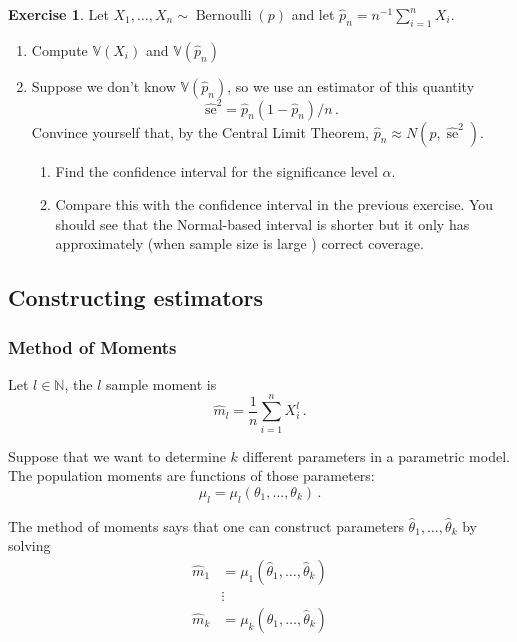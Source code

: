 \documentclass[
  openany]{book}
\theoremstyle{definition}
\theoremstyle{definition}
\theoremstyle{definition}
\newtheorem{exercise}{Exercise}[chapter]
\theoremstyle{definition}
\theoremstyle{remark}
\begin{document}
\begin{exercise}

Let \(X_1, \ldots, X_n \sim \operatorname{Bernoulli}(p)\) and let \(\widehat{p}_n=n^{-1} \sum_{i=1}^n X_i\).

\begin{enumerate}
\def\labelenumi{\arabic{enumi}.}
\item
  Compute \(\mathbb{V}( X_i)\) and \(\mathbb{V}(\hat p_n)\)
\item
  Suppose we don't know \(\mathbb{V}(\hat p_n)\), so we use an estimator of this quantity
  \[\widehat{\mathrm{se}}^2 = {\widehat{p}_n\left(1-\widehat{p}_n\right) / n} \,.\]
  Convince yourself that, by the Central Limit Theorem, \(\widehat{p}_n \approx N\left(p, \widehat{\operatorname{se}}^2\right)\).

  \begin{enumerate}
  \def\labelenumii{\arabic{enumii}.}
  \item
    Find the confidence interval for the significance level \(\alpha\).
  \item
    Compare this with the confidence interval in the previous exercise.
    You should see that the Normal-based interval is shorter but it only has approximately (when sample size is large ) correct coverage.
  \end{enumerate}
\end{enumerate}

\end{exercise}

\subsection{Constructing estimators}\label{constructing-estimators}

\subsubsection{Method of Moments}\label{method-of-moments}

Let \(l \in \mathbb{N}\), the \(l\) sample moment is
\[
   \hat m_l = \frac 1 n \sum_{i=1}^n X_i^l \,.
\]

Suppose that we want to determine \(k\) different parameters in a parametric model.
The population moments are functions of those parameters:
\[
 \mu_l = \mu_l (\theta_1, \dots, \theta_k) \,.
\]

The method of moments says that one can construct parameters \(\hat \theta_1, \dots, \hat \theta_k\) by solving
\[
\begin{aligned}
    \hat m_1 &= \mu_1 (\hat \theta_1, \dots, \hat \theta_k) \\
    &\vdots\\
    \hat m_k &= \mu_k (\hat \theta_1, \dots, \hat \theta_k) \\
\end{aligned}
\]
\end{document}
